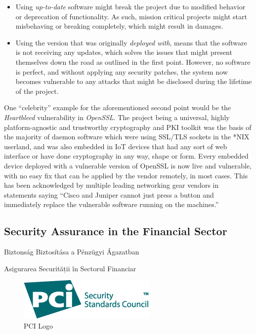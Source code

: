 \documentclass[a4paper,12pt]{article}
\newcommand\subsectionhu[1]{\addcontentsline{toc.hu}{subsection} {\protect\numberline{\thesubsection} #1}}
\newcommand\subsectionro[1]{\addcontentsline{toc.ro}{subsection} {\protect\numberline{\thesubsection} #1}}
\begin{document}
	\begin{itemize}
		\item Using \textit{up-to-date} software might break the project due to modified behavior or deprecation of functionality. As such, mission critical projects might start misbehaving or breaking completely, which might result in damages.
		\item Using the version that was originally \textit{deployed with}, means that the software is not receiving any updates, which solves the issues that might present themselves down the road as outlined in the first point. However, no software is perfect, and without applying any security patches, the system now becomes vulnerable to any attacks that might be disclosed during the lifetime of the project.
	\end{itemize}
	
	One ``celebrity'' example for the aforementioned second point would be the \textit{Heartbleed} vulnerability in \textit{OpenSSL}. The project being a universal, highly platform-agnostic and trustworthy cryptography and PKI toolkit was the basis of the majority of daemon software which were using SSL/TLS sockets in the *NIX userland, and was also embedded in IoT devices that had any sort of web interface or have done cryptography in any way, shape or form. Every embedded device deployed with a vulnerable version of OpenSSL is now live and vulnerable, with no easy fix that can be applied by the vendor remotely, in most cases. This has been acknowledged by multiple leading networking gear vendors in statements saying ``Cisco and Juniper cannot just press a button and immediately replace the vulnerable software running on the machines.''\cite{jpaglier14}
	
\subsection{Security Assurance in the Financial Sector} \label{ssec:secassfinsec}
\subsectionhu{Biztonság Biztosítása a Pénzügyi Ágazatban} \subsectionro{Asigurarea Securității în Sectorul Financiar}

	\begin{figure}
		\vspace{-10pt}
		\centering
		\includegraphics[scale=0.5]{pci.png}
		\caption{PCI Logo}
	\end{figure}
\end{document}
